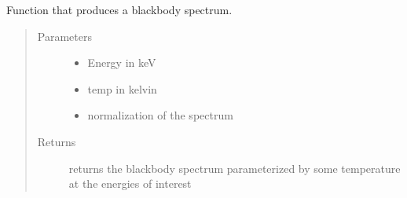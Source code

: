 \documentclass[letterpaper,10pt,english]{sphinxmanual}
\begin{document}
\begin{fulllineitems}
\label{\detokenize{read_process_files:read_process_files.blackbody}}
Function that produces a blackbody spectrum.
\begin{quote}\begin{description}
\item[{Parameters}] \leavevmode\begin{itemize}
\item {} 
 \textendash{} Energy in keV

\item {} 
 \textendash{} temp in kelvin

\item {} 
 \textendash{} normalization of the spectrum

\end{itemize}

\item[{Returns}] \leavevmode
returns the blackbody spectrum parameterized by some temperature at the energies of interest

\end{description}\end{quote}

\end{fulllineitems}

\end{document}
